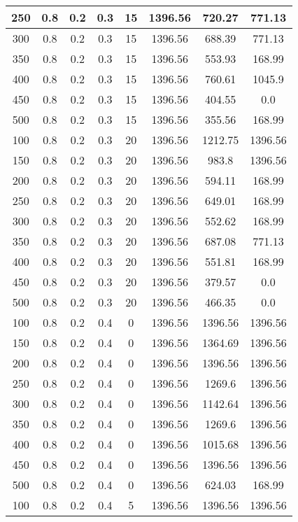 \documentclass[a4paper, 12pt]{extreport}
\begin{document}
\begin{itemize}
\begin{longtable}{|c|c|c|c|c|c|c|c|}
			250 & 0.8 & 0.2 & 0.3 & 15 & 1396.56 & 720.27 & 771.13 \\\hline
			300 & 0.8 & 0.2 & 0.3 & 15 & 1396.56 & 688.39 & 771.13 \\\hline
			350 & 0.8 & 0.2 & 0.3 & 15 & 1396.56 & 553.93 & 168.99 \\\hline
			400 & 0.8 & 0.2 & 0.3 & 15 & 1396.56 & 760.61 & 1045.9 \\\hline
			450 & 0.8 & 0.2 & 0.3 & 15 & 1396.56 & 404.55 & 0.0 \\\hline
			500 & 0.8 & 0.2 & 0.3 & 15 & 1396.56 & 355.56 & 168.99 \\\hline
			100 & 0.8 & 0.2 & 0.3 & 20 & 1396.56 & 1212.75 & 1396.56 \\\hline
			150 & 0.8 & 0.2 & 0.3 & 20 & 1396.56 & 983.8 & 1396.56 \\\hline
			200 & 0.8 & 0.2 & 0.3 & 20 & 1396.56 & 594.11 & 168.99 \\\hline
			250 & 0.8 & 0.2 & 0.3 & 20 & 1396.56 & 649.01 & 168.99 \\\hline
			300 & 0.8 & 0.2 & 0.3 & 20 & 1396.56 & 552.62 & 168.99 \\\hline
			350 & 0.8 & 0.2 & 0.3 & 20 & 1396.56 & 687.08 & 771.13 \\\hline
			400 & 0.8 & 0.2 & 0.3 & 20 & 1396.56 & 551.81 & 168.99 \\\hline
			450 & 0.8 & 0.2 & 0.3 & 20 & 1396.56 & 379.57 & 0.0 \\\hline
			500 & 0.8 & 0.2 & 0.3 & 20 & 1396.56 & 466.35 & 0.0 \\\hline
			100 & 0.8 & 0.2 & 0.4 & 0 & 1396.56 & 1396.56 & 1396.56 \\\hline
			150 & 0.8 & 0.2 & 0.4 & 0 & 1396.56 & 1364.69 & 1396.56 \\\hline
			200 & 0.8 & 0.2 & 0.4 & 0 & 1396.56 & 1396.56 & 1396.56 \\\hline
			250 & 0.8 & 0.2 & 0.4 & 0 & 1396.56 & 1269.6 & 1396.56 \\\hline
			300 & 0.8 & 0.2 & 0.4 & 0 & 1396.56 & 1142.64 & 1396.56 \\\hline
			350 & 0.8 & 0.2 & 0.4 & 0 & 1396.56 & 1269.6 & 1396.56 \\\hline
			400 & 0.8 & 0.2 & 0.4 & 0 & 1396.56 & 1015.68 & 1396.56 \\\hline
			450 & 0.8 & 0.2 & 0.4 & 0 & 1396.56 & 1396.56 & 1396.56 \\\hline
			500 & 0.8 & 0.2 & 0.4 & 0 & 1396.56 & 624.03 & 168.99 \\\hline
			100 & 0.8 & 0.2 & 0.4 & 5 & 1396.56 & 1396.56 & 1396.56 \\\hline

\end{longtable}
\end{itemize}
\end{document}
